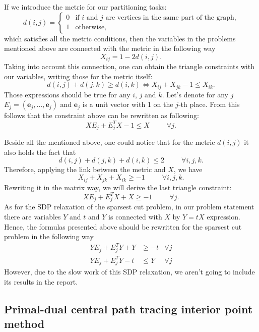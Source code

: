 \documentclass[12pt]{article}
\begin{document}
If we introduce the metric for our partitioning tasks:
\[
d(i,j) = \begin{cases}
    0 & \text{if $i$ and $j$ are vertices in the same part of the graph,}\\
    1 & \text{otherwise,}
\end{cases}
\]
which satisfies all the metric conditions, then the variables in the problems mentioned above are connected with the metric in the following way
\[
X_{ij} = 1 - 2d(i,j).
\]
Taking into account this connection, one can obtain the triangle constraints with our variables, writing those for the metric itself:
\[
d(i,j) + d(j, k) \geq d(i,k) \Leftrightarrow X_{ij} + X_{jk} - 1 \leq X_{ik}. 
\]
Those expressions should be true for any $i$, $j$ and $k$. Let's denote for any $j$ $E_j = (\mathbf{e}_j, \dots, \mathbf{e}_j)$ and $\mathbf{e}_j$ is a unit vector with 1 on the $j$-th place. From this follows that the constraint above can be rewritten as following:
\[
XE_j + E_j^T X - 1 \leq X ~~~~~~~~~~~ \forall j. 
\]

Beside all the mentioned above, one could notice that for the metric $d(i,j)$ it also holds the fact that
\[
d(i,j) + d(j,k) + d(i,k) \leq 2 ~~~~~~~~~~~ \forall i, j, k.
\]
Therefore, applying the link between the metric and $X$, we have
\[
X_{ij} + X_{jk} + X_{ik} \geq -1 ~~~~~~~~~~~ \forall i, j, k.
\]
Rewriting it in the matrix way, we will derive the last triangle constraint:
\[
XE_j + E_j^T X + X \geq -1 ~~~~~~~~~~~ \forall j.
\]
As for the SDP relaxation of the sparsest cut problem, in our problem statement there are variables $Y$ and $t$ and $Y$ is connected with $X$ by $Y = tX$ expression. Hence, the formulas presented above should be rewritten for the sparsest cut problem in the following way
\begin{align*}
    YE_j + E_j^T Y + Y &\geq -t  &\forall j \\
    YE_j + E_j^T Y - t &\leq Y  &\forall j
\end{align*}
However, due to the slow work of this SDP relaxation, we aren't going to include its results in the report.







\subsection{Primal-dual central path tracing interior point method}
\end{document}
